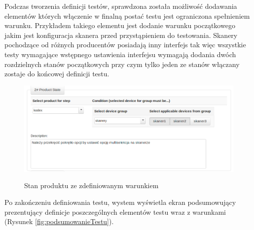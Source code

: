   
  
  Podczas tworzenia definicji testów, sprawdzona została możliwość dodawania elementów których włączenie w finalną postać testu jest ograniczona spełnieniem warunku. Przykładem takiego elementu jest dodanie warunku początkowego jakim jest konfiguracja skanera przed przystąpieniem do testowania. Skanery pochodzące od różnych producentów posiadają inny interfejs tak więc wszystkie testy wymagające wstępnego ustawienia interfejsu wymagają dodania dwóch rozdzielnych stanów początkowych przy czym tylko jeden ze stanów włączany zostaje do końcowej definicji testu.
   \begin{figure}[h]
  \begin{center}
    \includegraphics[scale=0.4]{img/screen/stanProdutuZwyboremWarunku.png}
    \label{fig:stanProduktuZwarunkiem}
    \caption{Stan produktu ze zdefiniowanym warunkiem}
  \end{center}
\end{figure}
\pagebreak

Po zakończeniu definiowania testu, wystem wyświetla ekran podsumowujący prezentujący definicje poszczególnych elementów testu wraz z warunkami (Rysunek \ref{fig:podsumowanieTestu}).

